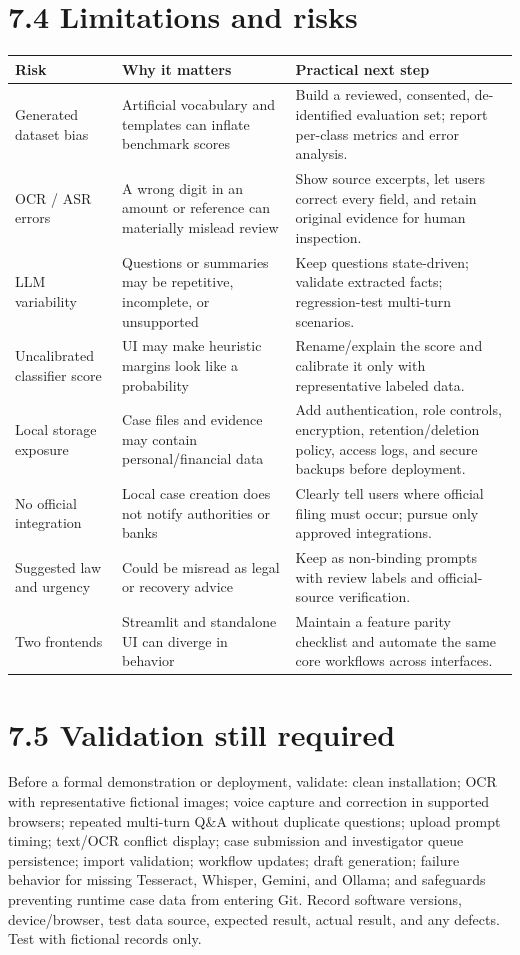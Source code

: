 \documentclass[12pt,a4paper,oneside]{report}
\begin{document}
\section{7.4 Limitations and risks}
\begin{longtable}{p{}p{}p{}}
\toprule
\textbf{Risk} & \textbf{Why it matters} & \textbf{Practical next step} \\
\midrule
Generated dataset bias & Artificial vocabulary and templates can inflate benchmark scores & Build a reviewed, consented, de-identified evaluation set; report per-class metrics and error analysis. \\
OCR / ASR errors & A wrong digit in an amount or reference can materially mislead review & Show source excerpts, let users correct every field, and retain original evidence for human inspection. \\
LLM variability & Questions or summaries may be repetitive, incomplete, or unsupported & Keep questions state-driven; validate extracted facts; regression-test multi-turn scenarios. \\
Uncalibrated classifier score & UI may make heuristic margins look like a probability & Rename/explain the score and calibrate it only with representative labeled data. \\
Local storage exposure & Case files and evidence may contain personal/financial data & Add authentication, role controls, encryption, retention/deletion policy, access logs, and secure backups before deployment. \\
No official integration & Local case creation does not notify authorities or banks & Clearly tell users where official filing must occur; pursue only approved integrations. \\
Suggested law and urgency & Could be misread as legal or recovery advice & Keep as non-binding prompts with review labels and official-source verification. \\
Two frontends & Streamlit and standalone UI can diverge in behavior & Maintain a feature parity checklist and automate the same core workflows across interfaces. \\
\bottomrule
\end{longtable}
\section{7.5 Validation still required}
Before a formal demonstration or deployment, validate: clean installation; OCR with representative fictional images; voice capture and correction in supported browsers; repeated multi-turn Q\&A without duplicate questions; upload prompt timing; text/OCR conflict display; case submission and investigator queue persistence; import validation; workflow updates; draft generation; failure behavior for missing Tesseract, Whisper, Gemini, and Ollama; and safeguards preventing runtime case data from entering Git. Record software versions, device/browser, test data source, expected result, actual result, and any defects. Test with fictional records only.
\end{document}
